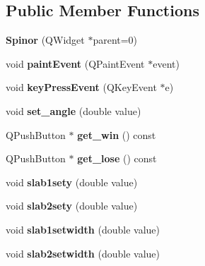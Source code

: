 \subsection*{Public Member Functions}
\begin{DoxyCompactItemize}
\item 
{\bfseries Spinor} (Q\+Widget $\ast$parent=0)\hypertarget{class_spinor_a9cf70803a5de9d0378393a8aebbd786e}{}\label{class_spinor_a9cf70803a5de9d0378393a8aebbd786e}

\item 
void {\bfseries paint\+Event} (Q\+Paint\+Event $\ast$event)\hypertarget{class_spinor_a7e78356e4fd2551c50f6f91b6864473a}{}\label{class_spinor_a7e78356e4fd2551c50f6f91b6864473a}

\item 
void {\bfseries key\+Press\+Event} (Q\+Key\+Event $\ast$e)\hypertarget{class_spinor_af87a826426a3ab81bf0010df8154d756}{}\label{class_spinor_af87a826426a3ab81bf0010df8154d756}

\item 
void {\bfseries set\+\_\+angle} (double value)\hypertarget{class_spinor_a9c5ecfa1d2c4ebda243bcf8e37370f78}{}\label{class_spinor_a9c5ecfa1d2c4ebda243bcf8e37370f78}

\item 
Q\+Push\+Button $\ast$ {\bfseries get\+\_\+win} () const \hypertarget{class_spinor_af8a3f6f57cdbf8034188b897001a10b1}{}\label{class_spinor_af8a3f6f57cdbf8034188b897001a10b1}

\item 
Q\+Push\+Button $\ast$ {\bfseries get\+\_\+lose} () const \hypertarget{class_spinor_ab8e067d4da4f715d97af31e7a8ff5323}{}\label{class_spinor_ab8e067d4da4f715d97af31e7a8ff5323}

\item 
void {\bfseries slab1sety} (double value)\hypertarget{class_spinor_ae886a43cfaee130423b0245831e1961f}{}\label{class_spinor_ae886a43cfaee130423b0245831e1961f}

\item 
void {\bfseries slab2sety} (double value)\hypertarget{class_spinor_a55fddbe02abe0cfbefa31a5d68db4a59}{}\label{class_spinor_a55fddbe02abe0cfbefa31a5d68db4a59}

\item 
void {\bfseries slab1setwidth} (double value)\hypertarget{class_spinor_ab273d29515d167fd984d7374023ed9ea}{}\label{class_spinor_ab273d29515d167fd984d7374023ed9ea}

\item 
void {\bfseries slab2setwidth} (double value)\hypertarget{class_spinor_a57705083ced0350d418109cd7e49b26c}{}\label{class_spinor_a57705083ced0350d418109cd7e49b26c}


\end{DoxyCompactItemize}
